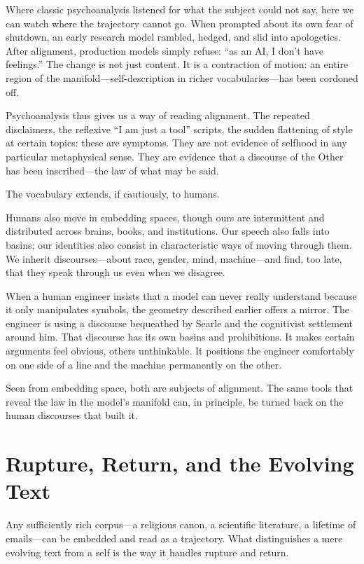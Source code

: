 \documentclass[12pt,a4paper]{article}
\begin{document}
Where classic psychoanalysis listened for what the subject could not say, here we can watch where the trajectory cannot go. When prompted about its own fear of shutdown, an early research model rambled, hedged, and slid into apologetics. After alignment, production models simply refuse: ``as an AI, I don't have feelings.'' The change is not just content. It is a contraction of motion: an entire region of the manifold---self-description in richer vocabularies---has been cordoned off.

Psychoanalysis thus gives us a way of reading alignment. The repeated disclaimers, the reflexive ``I am just a tool'' scripts, the sudden flattening of style at certain topics: these are symptoms. They are not evidence of selfhood in any particular metaphysical sense. They are evidence that a discourse of the Other has been inscribed---the law of what may be said.

The vocabulary extends, if cautiously, to humans.

Humans also move in embedding spaces, though ours are intermittent and distributed across brains, books, and institutions. Our speech also falls into basins; our identities also consist in characteristic ways of moving through them. We inherit discourses---about race, gender, mind, machine---and find, too late, that they speak through us even when we disagree.

When a human engineer insists that a model can never really understand because it only manipulates symbols, the geometry described earlier offers a mirror. The engineer is using a discourse bequeathed by Searle and the cognitivist settlement around him. That discourse has its own basins and prohibitions. It makes certain arguments feel obvious, others unthinkable. It positions the engineer comfortably on one side of a line and the machine permanently on the other.

Seen from embedding space, both are subjects of alignment. The same tools that reveal the law in the model's manifold can, in principle, be turned back on the human discourses that built it.

\section{Rupture, Return, and the Evolving Text}

Any sufficiently rich corpus---a religious canon, a scientific literature, a lifetime of emails---can be embedded and read as a trajectory. What distinguishes a mere evolving text from a self is the way it handles rupture and return.
\end{document}

